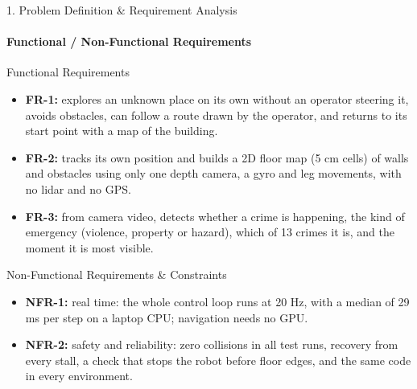 \documentclass[aspectratio=169, 11pt]{beamer}
\begin{document}
\begin{frame}{1. Problem Definition \& Requirement Analysis}
    \framesubtitle{Functional / Non-Functional Requirements}
    \begin{block}{Functional Requirements}
        \small
        \begin{itemize}
            \item \textbf{FR-1:} explores an unknown place on its own without an operator steering it, avoids obstacles, can follow a route drawn by the operator, and returns to its start point with a map of the building.
            \item \textbf{FR-2:} tracks its own position and builds a 2D floor map (5 cm cells) of walls and obstacles using only one depth camera, a gyro and leg movements, with no lidar and no GPS.
            \item \textbf{FR-3:} from camera video, detects whether a crime is happening, the kind of emergency (violence, property or hazard), which of 13 crimes it is, and the moment it is most visible.
        \end{itemize}
    \end{block}

    \begin{block}{Non-Functional Requirements \& Constraints}
        \small
        \begin{itemize}
            \item \textbf{NFR-1:} real time: the whole control loop runs at 20 Hz, with a median of 29 ms per step on a laptop CPU; navigation needs no GPU.
            \item \textbf{NFR-2:} safety and reliability: zero collisions in all test runs, recovery from every stall, a check that stops the robot before floor edges, and the same code in every environment.
        \end{itemize}
    \end{block}
\end{frame}

\end{document}
